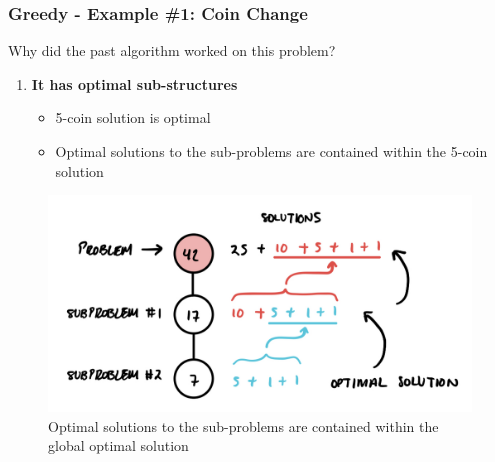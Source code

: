 \documentclass{beamer}
\begin{document}
\begin{frame}[fragile]
\frametitle{Greedy - Example \#1: Coin Change}

\color{blue}Why did the past algorithm worked on this problem?\color{black}

\begin{enumerate}
    \item \textbf{It has optimal sub-structures}
    	\begin{itemize}
		    \item 5-coin solution is optimal
		    \item Optimal solutions to the sub-problems are contained within the 5-coin solution
		\end{itemize}
\end{enumerate}

\begin{figure}
    \centering
    \includegraphics[scale=0.2]{imgs/coin_change_1.jpeg}
    \caption{Optimal solutions to the sub-problems are contained within the global optimal solution}
\end{figure}

\end{frame}
\end{document}
